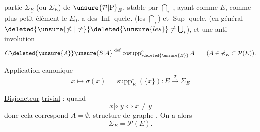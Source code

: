 partie $\mathbb{\Sigma}_{\underline{E}}$ (ou $\mathbb{\Sigma}_{E}$) de $\unsure{\mathcal{P}|\mathrm{P}}_{E}$, stable par $\bigcap_{i}$ , ayant comme   $E$, comme plus petit élément le  $E_{0}$.  a des $\operatorname{Inf}$ quelc. (les $\bigcap_{i}$) et $\operatorname{Sup}$ quelc. (en général $\deleted{\unsure{\not\leq|\neq}}\deleted{\unsure{les}}\ne\bigcup_{i}$), et une anti-involution
\[
C\deleted{\unsure{A}}\unsure{S|A}\overset{\mathrm{def}}{=}\operatorname{cosupp}_{\deleted{\unsure{E}}}^{\circ}A
\qquad (A\in\mathbb{\Sigma}_{E}\subset\mathcal{P}(E)).
\]

Application canonique
\[
x\longmapsto\sigma(x)=\operatorname{supp}_{E}^{\circ}(\{x\}):E\xrightarrow{\sigma}\mathbb{\Sigma}_{E}
\]

\uline{Disjoncteur} \uline{trivial} : quand
\[
x\mathrel{|\circ|}y\Longleftrightarrow x\ne y
\]
donc cela correspond  $A=\emptyset$, structure de graphe . On a alors
\[
\mathbb{\Sigma}_{E}=\mathcal{P}(E).
\]

